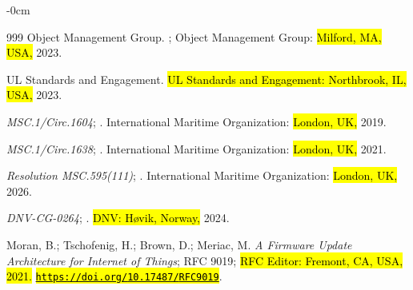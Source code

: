 \documentclass[blockchains,review,accept,moreauthors]{Definitions/mdpi}
\begin{document}
\begin{adjustwidth}{-\extralength}{0cm}
\begin{thebibliography}{999}
{Object Management Group}.
;  Object Management Group: \hl{Milford, MA, USA,} 2023.

{UL Standards and Engagement}.
  \hl{UL Standards and Engagement: Northbrook, IL, USA,} 2023.

\emph{MSC.1/Circ.1604};
. International Maritime Organization: \hl{London, UK,}  2019.

\emph{MSC.1/Circ.1638};
.  International Maritime Organization: \hl{London, UK,} 2021.

\emph{Resolution MSC.595(111)}; 
. International Maritime Organization: \hl{London, UK,} 2026.

\emph{DNV-CG-0264};
. \hl{DNV: Høvik, Norway,} 2024.

Moran, B.; Tschofenig, H.; Brown, D.; Meriac, M.
\newblock \emph{A Firmware Update Architecture for Internet of Things};
\newblock RFC 9019; \hl{RFC Editor: Fremont, CA, USA,} \hl{2021.} %
\newblock \href{https://doi.org/10.17487/RFC9019}{\hl{\mbox{\nolinkurl{https://doi.org/}}}}\allowbreak\href{https://doi.org/10.17487/RFC9019}{\hl{\mbox{\nolinkurl{10.17487/}}}}\allowbreak\href{https://doi.org/10.17487/RFC9019}{\hl{\mbox{\nolinkurl{RFC9019}}}}.


\end{thebibliography}
\end{adjustwidth}
\end{document}
